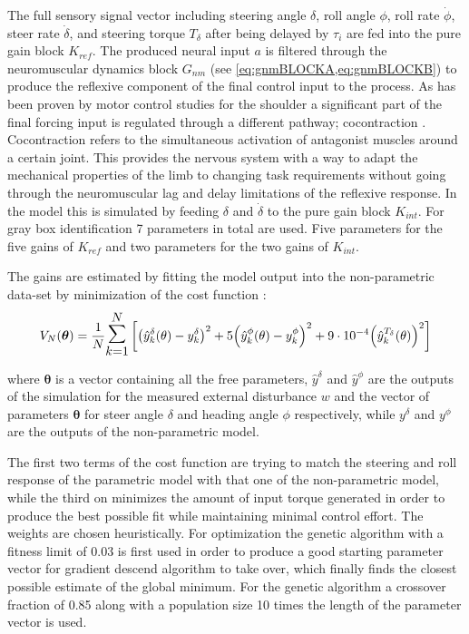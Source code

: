 The full sensory signal vector including steering angle \ensuremath{\delta}, roll angle \ensuremath{\phi}, roll rate \ensuremath{\dot{\phi}}, steer rate \ensuremath{\dot{\delta}}, and steering torque \ensuremath{T_\delta} after being delayed by \ensuremath{\tau_i} are fed into the pure gain block \ensuremath{K_{ref}}. The produced neural input \ensuremath{a} is filtered through the neuromuscular dynamics block \ensuremath{G_{nm}} (see \cref{eq:gnmBLOCKA,eq:gnmBLOCKB}) to produce the reflexive component of the final control input to the process. As has been proven by motor control studies for the shoulder a significant part of the final forcing input is regulated through a different pathway; cocontraction \cite{schouten2008nmclab} . Cocontraction refers to the  simultaneous activation of antagonist muscles around a certain joint. This  provides the nervous system with a way to adapt the mechanical properties of the limb to changing task requirements without going through the neuromuscular lag and delay limitations of the reflexive response. In the model this is simulated by feeding \ensuremath{\delta} and \ensuremath{\dot{\delta}} to the pure gain block \ensuremath{K_{int}}. For gray box identification 7 parameters in total are used. Five parameters for the five gains of \ensuremath{K_{ref}} and two parameters for the two gains of \ensuremath{K_{int}}.




The gains are estimated by fitting the model output into the non-parametric data-set by minimization of the cost function :
\begin{equation}
    V_{N}(\boldsymbol{\theta})=\frac{1}{N} \mathlarger{\mathlarger{\mathlarger{\sum}}}_{k=1}^{N}\left[{\left(\hat{y}^{\delta}_k(\mathbf{\theta})-y^\delta_k\right)^{2}}+5{\left(\hat{y}^{\phi}_k(\mathbf{\theta})-y^\phi_k\right)^{2}}+9\cdot10^{-4}{\left(\hat{y}^{T_\delta}_k(\mathbf{\theta})\right)^2}\right]
    \label{eq:cost2}
    \end{equation}

where \ensuremath{\boldsymbol{\theta}} is a vector containing all the free parameters, \ensuremath{\hat{y}^{\delta}} and \ensuremath{\hat{y}^{\phi}} are the outputs of the simulation for the measured external disturbance \ensuremath{w} and the vector of parameters  \ensuremath{\boldsymbol{\theta}} for steer angle \ensuremath{\delta} and heading angle \ensuremath{\phi}  respectively, while \ensuremath{y^\delta} and \ensuremath{y^\phi} are the outputs of the non-parametric model.

The first two terms  of the cost function are trying to match the steering and roll  response of the parametric model with that one of the non-parametric model, while the third on minimizes the amount of input torque generated in order to produce the best possible fit while maintaining minimal control effort. The weights are chosen heuristically. For optimization the genetic algorithm with a fitness limit of 0.03 is first  used in order to produce a good starting parameter vector for gradient descend algorithm to take over, which finally finds the closest possible estimate of the global minimum. For the genetic algorithm a crossover fraction of 0.85  along with a population size 10 times the length of the parameter vector is used. 

